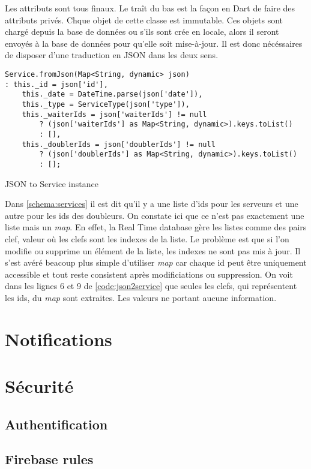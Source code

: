 Les attributs sont tous finaux. Le traît du bas est la façon en Dart de faire des attributs privés. Chque objet de cette classe est immutable. Ces objets sont chargé depuis la base de données ou s'ils sont crée en locale, alors il seront envoyés à la base de données pour qu'elle soit mise-à-jour. Il est donc nécéssaires de disposer d'une traduction en JSON dans les deux sens. 

\begin{listing}[!h]
\begin{verbatim}
Service.fromJson(Map<String, dynamic> json)
: this._id = json['id'],
    this._date = DateTime.parse(json['date']),
    this._type = ServiceType(json['type']),
    this._waiterIds = json['waiterIds'] != null
        ? (json['waiterIds'] as Map<String, dynamic>).keys.toList()
        : [],
    this._doublerIds = json['doublerIds'] != null
        ? (json['doublerIds'] as Map<String, dynamic>).keys.toList()
        : [];
\end{verbatim}
\caption{JSON to Service instance}
\label{code:json2service}
\end{listing}

Dans \ref{schema:services} il est dit qu'il y a une liste d'ids pour les serveurs et une autre pour les ids des doubleurs. On constate ici que ce n'est pas exactement une liste mais un \textit{map}. En effet, la Real Time database gère les listes comme des pairs {clef, valeur} où les clefs sont les indexes de la liste. Le problème est que si l'on modifie ou supprime un élément de la liste, les indexes ne sont pas mis à jour. Il s'est avéré beacoup plus simple d'utiliser \textit{map} car chaque id peut être uniquement accessible et tout reste consistent après modificiations ou suppression. On voit dans les lignes 6 et 9 de \ref{code:json2service} que seules les clefs, qui représentent les ids, du \textit{map} sont extraites. Les valeurs ne portant aucune information.  


\section{Notifications}



\section{Sécurité}

\subsection{Authentification}

\subsection{Firebase rules}
